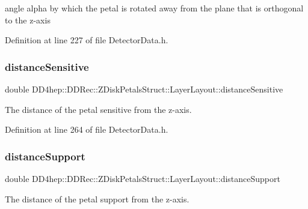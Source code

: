 angle alpha by which the petal is rotated away from the plane that is orthogonal to the z-\/axis 

Definition at line 227 of file Detector\+Data.\+h.

\hypertarget{struct_d_d4hep_1_1_d_d_rec_1_1_z_disk_petals_struct_1_1_layer_layout_a818dac342e6299ca88f0062682f7008d}{}\label{struct_d_d4hep_1_1_d_d_rec_1_1_z_disk_petals_struct_1_1_layer_layout_a818dac342e6299ca88f0062682f7008d} 
\subsubsection{\texorpdfstring{distance\+Sensitive}{distanceSensitive}}
{\footnotesize\ttfamily double D\+D4hep\+::\+D\+D\+Rec\+::\+Z\+Disk\+Petals\+Struct\+::\+Layer\+Layout\+::distance\+Sensitive}



The distance of the petal sensitive from the z-\/axis. 



Definition at line 264 of file Detector\+Data.\+h.

\hypertarget{struct_d_d4hep_1_1_d_d_rec_1_1_z_disk_petals_struct_1_1_layer_layout_a2c3400e7a403bd903dfe542baaae4ead}{}\label{struct_d_d4hep_1_1_d_d_rec_1_1_z_disk_petals_struct_1_1_layer_layout_a2c3400e7a403bd903dfe542baaae4ead} 
\subsubsection{\texorpdfstring{distance\+Support}{distanceSupport}}
{\footnotesize\ttfamily double D\+D4hep\+::\+D\+D\+Rec\+::\+Z\+Disk\+Petals\+Struct\+::\+Layer\+Layout\+::distance\+Support}



The distance of the petal support from the z-\/axis. 



